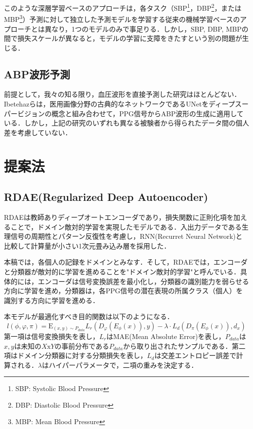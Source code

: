 \documentclass[twocolumn, a4paper]{ieicejsp}
\begin{document}
{このような深層学習ベースのアプローチは，各タスク（SBP\footnote{SBP: Systolic Blood Pressure}，DBP\footnote{DBP: Diastolic Blood Pressure}，またはMBP\footnote{MBP: Mean Blood Pressure}）予測に対して独立した予測モデルを学習する従来の機械学習ベースのアプローチとは異なり，1つのモデルのみで事足りる．しかし，SBP, DBP, MBPの間で損失スケールが異なると，モデルの学習に支障をきたすという別の問題が生じる．

\vspace{-0.4cm}
\subsection{ABP波形予測}
前提として，我々の知る限り，血圧波形を直接予測した研究はほとんどない．Ibetehaz\cite{ABP1}らは，医用画像分野の古典的なネットワークであるUNet\cite{ABP2}をディープスーパービジョンの概念と組み合わせて，PPG信号からABP波形の生成に適用している．しかし，上記の研究のいずれも異なる被験者から得られたデータ間の個人差を考慮していない．

\vspace{-0.2cm}
\section{提案法}

\subsection{RDAE(Regularized Deep Autoencoder)}
RDAEは教師ありディープオートエンコーダであり，損失関数に正則化項を加えることで，ドメイン敵対的学習を実現したモデルである．入出力データである生理信号の周期性とパターン反復性を考慮し，RNN(Recurret Neural Network)と比較して計算量が小さい1次元畳み込み層を採用した．

本稿では，各個人の記録をドメインとみなす．そして，RDAEでは，エンコーダと分類器が敵対的に学習を進めることを"ドメイン敵対的学習"と呼んでいる．具体的には，エンコーダは信号変換誤差を最小化し，分類器の識別能力を弱らせる方向に学習を進め，分類器は，各PPG信号の潜在表現の所属クラス（個人）を識別する方向に学習を進める．

本モデルが最適化すべき目的関数は以下のようになる．
\vspace{-0.2cm}
\begin{equation}
  l(\phi, \varphi, \pi) = \mathrm{E}_{(x, y) \sim P_{data}} L_r(D_{\varphi} (E_{\phi}(x)), y) - \lambda \cdot L_d (D_\pi (E_{\phi} (x)), d_x)
\end{equation}
第一項は信号変換損失を表し，$L_r$はMAE(Mean Absolute Error)を表し，$P_{data}$は
$x, y$は未知の$X \mathrm{x} Y$の事前分布である$P_{data}$から取り出されたサンプルである．第二項はドメイン分類器に対する分類損失を表し，$L_d$は交差エントロピー誤差で計算される．$\lambda$はハイパーパラメータで，二項の重みを決定する．

}
\end{document}
